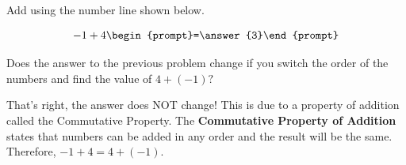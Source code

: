 \documentclass{ximera}[font=12pt]
\begin{document}
\begin{problem}
Add using the number line shown below.

\[ -1 + 4 \begin{prompt}=\answer{3}\end{prompt} \]



\end{problem}


\begin{problem}

    Does the answer to the previous problem change if you switch the order of the numbers and find the value of $4 + (-1)?$

\begin{multipleChoice}
\end{multipleChoice}

\begin{feedback}[correct]
That's right, the answer does NOT change!  This is due to a property of addition called the Commutative Property.  
The \textbf{Commutative Property of Addition} states that numbers can be added in any order and the result will be the same.  Therefore, $-1 + 4 = 4 + (-1).$
\end{feedback}

\end{problem}
\end{document}
